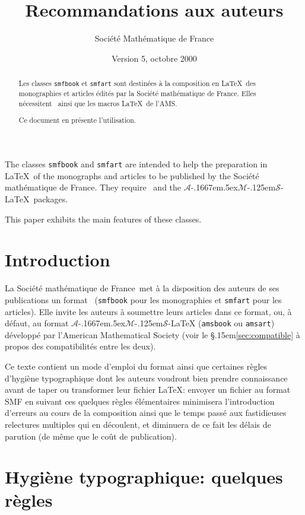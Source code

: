 \documentclass[11pt,francais]{smfart}
\title{Recommandations aux auteurs}
\date {Version 5, octobre 2000}
\author{Soci\'et\'e Ma\-th\'e\-ma\-ti\-que de France}
\newcommand{\SmF}{Soci\'et\'e ma\-th\'e\-ma\-ti\-que de France}
\newcommand{\T}{\S\kern .15em\relax }
\newcommand{\AMS}{$\mathcal{A}$\kern-.1667em\lower.5ex\hbox
        {$\mathcal{M}$}\kern-.125em$\mathcal{S}$}
\begin{document}
\def\smfbyname{}

\begin{abstract}
Les classes \texttt{smfbook} et \texttt{smfart} sont destin\'ees \`a la composition en \LaTeX\ des monographies et articles \'edit\'es par la \SmF. Elles n\'ecessitent \LaTeXe\ ainsi que les macros \LaTeX\ de l'AMS.\par
Ce document en pr\'esente l'utilisation.
\end{abstract}

\begin{altabstract}
The classes \texttt{smfbook} and \texttt{smfart} are intended to help the preparation in \LaTeX\ of the monographs and articles to be published by the \SmF. They require \LaTeXe\ and the \AMS-\LaTeX\ packages.\par
This paper exhibits the main features of these classes.
\end{altabstract}
\maketitle

\tableofcontents

\section{Introduction}
La \SmF\ met \`a la disposition des auteurs de ses publications un format
\LaTeXe\ (\texttt{smfbook} pour les monographies et \texttt{smfart} pour
les articles). Elle invite les auteurs \`a soumettre leurs articles dans ce
format, ou, \`a d\'efaut, au format {\AMS-\LaTeX} (\texttt{amsbook} ou
\texttt{amsart}) d\'evelopp\'e par l'American Mathematical Society (voir le
\T\ref{sec:compatible} \`a propos des compatibilit\'es entre les deux).

\smallskip
Ce texte contient un mode d'emploi du format ainsi que certaines r\`egles
d'hygi\`ene typographique dont les auteurs voudront bien prendre
connaissance avant de taper ou transformer leur fichier \LaTeX: envoyer un
fichier au format SMF en suivant ces quelques r\`egles \'el\'ementaires
minimisera l'introduction d'erreurs au cours de la composition ainsi que le
temps pass\'e aux fastidieuses relectures multiples qui en d\'ecoulent, et
diminuera de ce fait les d\'elais de parution (de m\^eme que le co\^ut de
publication).

\section{Hygi\`ene typographique: quelques r\`egles}
\end{document}
